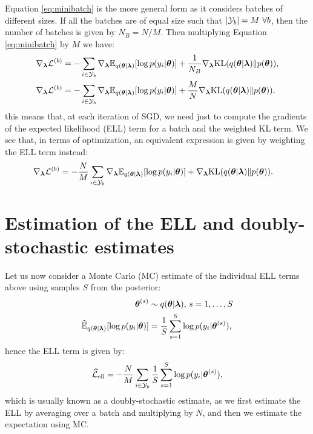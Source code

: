 \documentclass[11pt,a4paper]{article}
\newcommand{\vectheta}{\vecS{\theta}}
\newcommand{\param}{\vecS{\lambda}}
\newcommand{\slike}[1]{\log p(y_{#1}|\vectheta)}
\newcommand{\slikesample}[2]{\log p(y_{#1}|\vectheta^{(#2)})}
\newcommand{\prior}{p(\vectheta)}
\newcommand{\post}{q(\vectheta | \param)}
\newcommand{\nelbo}{{\mathcal{L}}}
\newcommand{\elltermhat}{{\widehat{\mathcal{L}}}_{\text{ell}}}
\newcommand{\singlenelbo}[1]{\nelbo^{(#1)}}
\newcommand{\batch}[1]{{\mathcal{Y}}_{#1}}
\newcommand{\batchsize}[1]{\abs{\batch{#1}}}
\begin{document}
Equation \eqref{eq:minibatch} is the more general form as it considers batches of different sizes.
If all the batches are of equal size such that $\batchsize{b}=M \ \forall b$, then the number of 
batches is given by $N_B = N/M$.  Then multiplying Equation  \eqref{eq:minibatch} by $M$ we have:
\begin{align}
	\grad_{\param}\singlenelbo{b} &= - \sum_{i \in \batch{b}}  \grad_{\param} \expectation{\post}{\slike{i}} + \frac{1}{N_B}  \grad_{\param}  \kl{\post}{\prior}\text{,} \\
		\grad_{\param}\singlenelbo{b} &= - \sum_{i \in \batch{b}}  \grad_{\param} \expectation{\post}{\slike{i}} + \frac{M}{N} \grad_{\param}  \kl{\post}{\prior}\text{.}
\end{align}
this means that, at each iteration of SGD, we need just to compute the gradients of the expected likelihood (ELL) term for a batch and the weighted KL term.
 We see that, in terms of optimization, an equivalent expression is given by weighting the ELL term instead:
 \begin{align}
 	\label{eq:gradfinal}
 		\grad_{\param}\singlenelbo{b} &= -  \frac{N}{M}  \sum_{i \in \batch{b}}  \grad_{\param} \expectation{\post}{\slike{i}} +  \grad_{\param}  \kl{\post}{\prior}\text{.}
 \end{align} 
%
\section{Estimation of the ELL and doubly-stochastic estimates}
Let us now consider a Monte Carlo (MC) estimate of the individual ELL terms above using samples $S$ from the posterior:
\begin{align}
	\vectheta^{(s)} & \sim \post \text{, } s=1, \ldots, S \\
	\expectationhat{\post}{\slike{i}}  &= \frac{1}{S} \sum_{s=1}^S  \slikesample{i}{s} \text{,}
\end{align}
hence the ELL term is given by:
\begin{equation}
 \elltermhat = 	- \frac{N}{M}  \sum_{i \in \batch{b}}  \frac{1}{S} \sum_{s=1}^S  \slikesample{i}{s} \text{,}
\end{equation}
which is usually known as a doubly-stochastic estimate, as we first estimate the ELL by averaging over a batch and  multiplying by $N$, and then we estimate the expectation using MC.  
%
\end{document}
